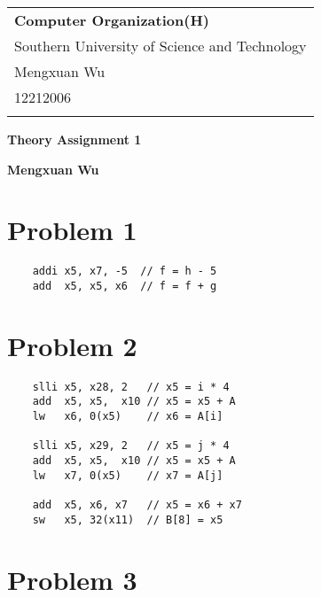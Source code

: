\documentclass[a4paper,12pt]{article}
\begin{document}
\thispagestyle{empty} %

\begin{tabular}{p{15.5cm}}
{\large \bf Computer Organization(H)} \\
Southern University of Science and Technology \\ Mengxuan Wu \\ 12212006 \\
\hline
\\
\end{tabular}

\vspace*{0.3cm} %

\begin{center}
	{\Large \bf Theory Assignment 1}
	\vspace{2mm}

	{\bf Mengxuan Wu}
		
\end{center}  

\vspace{0.4cm}

\section*{Problem 1}

\begin{verbatim}
	addi x5, x7, -5  // f = h - 5
	add  x5, x5, x6  // f = f + g
\end{verbatim}

\section*{Problem 2}

\begin{verbatim}
	slli x5, x28, 2   // x5 = i * 4
	add  x5, x5,  x10 // x5 = x5 + A
	lw   x6, 0(x5)    // x6 = A[i]

	slli x5, x29, 2   // x5 = j * 4
	add  x5, x5,  x10 // x5 = x5 + A
	lw   x7, 0(x5)    // x7 = A[j]

	add  x5, x6, x7   // x5 = x6 + x7
	sw   x5, 32(x11)  // B[8] = x5
\end{verbatim}

\section*{Problem 3}
\end{document}
